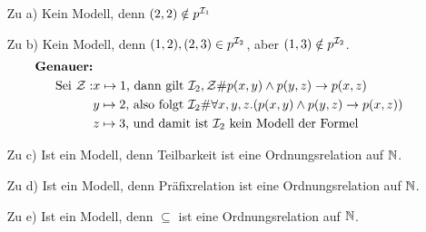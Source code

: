 \begin{enumerate}[leftmargin=1cm]
\item[Zu a)] Kein Modell, denn $(2,2) \notin p^{\mathcal{I}_1}$
\item[Zu b)] Kein Modell, denn $(1,2),(2,3) \in p^{\mathcal{I}_2}$, aber $(1,3) \notin p^{\mathcal{I}_2}$.
\begin{align*}
\text{\textbf{Genauer:}} \\
\text{Sei } \mathcal{Z}: &x \mapsto 1 \text{, dann gilt } \mathcal{I}_2, \mathcal{Z}\#p(x,y) \land p(y,z) \to p(x,z) \\
& y \mapsto 2 \text{, also folgt } \mathcal{I}_2\#\forall x, y, z.(p(x,y) \land p(y,z) \to p(x,z)) \\
& z \mapsto 3 \text{, und damit ist } \mathcal{I}_2 \text{ kein Modell der Formel}  
\end{align*}
\item[Zu c)] Ist ein Modell, denn Teilbarkeit ist eine Ordnungsrelation auf $\mathbb{N}$.
\item[Zu d)] Ist ein Modell, denn Präfixrelation ist eine Ordnungsrelation auf $\mathbb{N}$.
\item[Zu e)] Ist ein Modell, denn $\subseteq$ ist eine Ordnungsrelation auf $\mathbb{N}$.
\end{enumerate}

